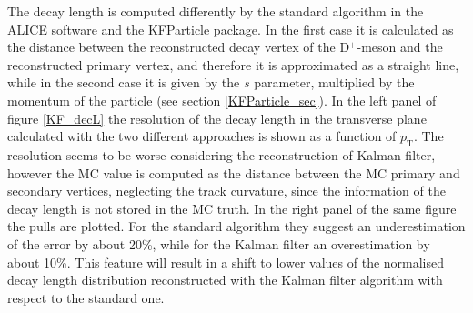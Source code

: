 \documentclass[b5paper,10pt,twoside,oldstyle,classica]{toptesi}
\newcommand{\pt}{p_\text{T}}
\begin{document}
The decay length is computed differently by the standard algorithm in the ALICE software and the KFParticle package. In the first case it is calculated as the distance between the reconstructed decay vertex of the D$^+$-meson and the reconstructed primary vertex, and therefore it is approximated as a straight line, while in the second case it is given by the $s$ parameter, multiplied by the momentum of the particle (see section \ref{KFParticle_sec}). In the left panel of figure \ref{KF_decL} the resolution of the decay length in the transverse plane calculated with the two different approaches is shown as a function of $\pt$. The resolution seems to be worse considering the reconstruction of Kalman filter, however the MC value is computed as the distance between the MC primary and secondary vertices, neglecting the track curvature, since the information of the decay length is not stored in the MC truth. In the right panel of the same figure the pulls are plotted. For the standard algorithm they suggest an underestimation of the error by about 20\%, while for the Kalman filter an overestimation by about 10\%. This feature will result in a shift to lower values of the normalised decay length distribution reconstructed with the Kalman filter algorithm with respect to the standard one.  
\end{document}
